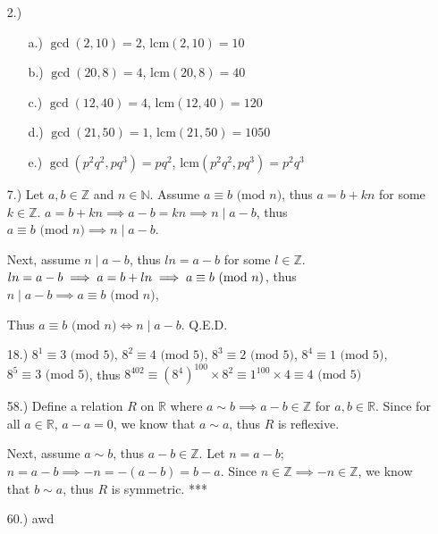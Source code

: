 \documentclass[12pt]{article}
\newcommand{\lcm}{\text{lcm}}
\newcommand{\pmd}[1]{\text{ (mod }#1\text{)}}
\begin{document}
\pagestyle{fancy}
\fancyhead{}

\normalsize

\begin{itemize}
    \item [2.)] \begin{itemize}
        \item [a.)] $\gcd(2,10)=2$, $\lcm(2,10)=10$
        \item [b.)] $\gcd(20,8)=4$, $\lcm(20,8)=40$
        \item [c.)] $\gcd(12,40)=4$, $\lcm(12,40)=120$
        \item [d.)] $\gcd(21,50)=1$, $\lcm(21,50)=1050$
        \item [e.)] $\gcd(p^2q^2,pq^3)=pq^2$, $\lcm(p^2q^2,pq^3)=p^2q^3$
    \end{itemize}

    \item [7.)] Let $a,b\in\mathbb{Z}$ and $n\in\mathbb{N}$. Assume $a\equiv b\pmd{n}$, thus $a=b+kn$ for some $k\in\mathbb{Z}$. $a=b+kn\implies a-b=kn\implies n\mid a-b$, thus $a\equiv b\pmd{n}\implies n\mid a-b$.
    
    Next, assume $n\mid a-b$, thus $ln=a-b$ for some $l\in\mathbb{Z}$. $ln=a-b\implies a=b+ln\break\implies a\equiv b\pmd{n}$, thus $n\mid a-b\implies a\equiv b\pmd{n}$,
    
    Thus $a\equiv b\pmd{n}\iff n\mid a-b$. Q.E.D.

    \item [18.)] $8^1\equiv3\pmd{5}$, $8^2\equiv4\pmd{5}$, $8^3\equiv2\pmd{5}$, $8^4\equiv1\pmd{5}$, $8^5\equiv3\pmd{5}$, thus $8^{402}\equiv(8^4)^{100}\times8^2\equiv1^{100}\times4\equiv4\pmd{5}$
    
    \item [58.)] Define a relation $R$ on $\mathbb{R}$ where $a\sim b\implies a-b\in\mathbb{Z}$ for $a,b\in\mathbb{R}$. Since for all $a\in\mathbb{R}$, $a-a=0$, we know that $a\sim a$, thus $R$ is reflexive.
    
    Next, assume $a\sim b$, thus $a-b\in\mathbb{Z}$. Let $n=a-b$; $n=a-b\implies -n=-(a-b)=b-a$. Since $n\in\mathbb{Z}\implies-n\in\mathbb{Z}$, we know that $b\sim a$, thus $R$ is symmetric. ***

    \item [60.)] awd
\end{itemize}
\end{document}
